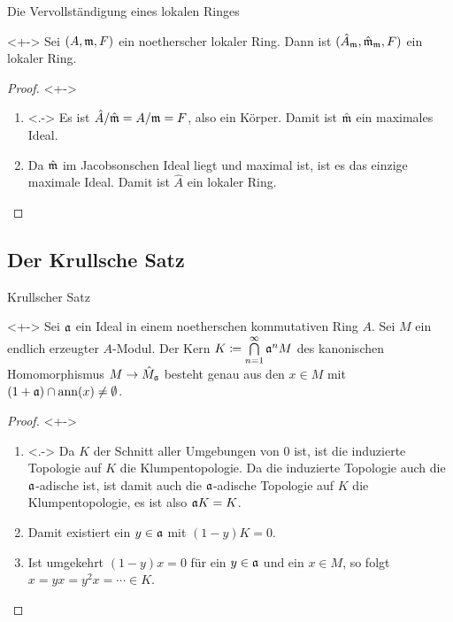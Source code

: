 \begin{frame}{Die Vervollständigung eines lokalen Ringes}
	\begin{proposition}<+->
		Sei \((A, \mathfrak{m}, F)\) ein noetherscher lokaler Ring. Dann ist
		\((\hat A_{\mathfrak{m}}, \hat{\mathfrak{m}}_{\mathfrak{m}}, F)\) ein lokaler Ring.
	\end{proposition}
	\begin{proof}<+->
		\begin{enumerate}[<+->]
		\item<.->
			Es ist \(\hat A/\hat{\mathfrak{m}} = A/\mathfrak{m} = F\), also ein Körper.  Damit ist
			\(\hat {\mathfrak{m}}\) ein maximales Ideal.
		\item
			Da \(\hat {\mathfrak{m}}\) im Jacobsonschen Ideal liegt und maximal ist, ist es das einzige
			maximale Ideal. Damit ist \(\hat A\) ein lokaler Ring.
			\qedhere
		\end{enumerate}
	\end{proof}
\end{frame}

\subsection{Der Krullsche Satz}

\begin{frame}{Krullscher Satz}
	\begin{theorem}<+->
		\label{thm:krull}
		Sei \(\mathfrak{a}\) ein Ideal in einem noetherschen kommutativen Ring \(A\). Sei
		\(M\) ein endlich erzeugter \(A\)-Modul. Der Kern \(K \coloneqq \bigcap\limits_{n = 1}^\infty
		\mathfrak{a}^n M\) des kanonischen Homomorphismus \(M \to \hat M_{\mathfrak{a}}\) besteht genau
		aus den \(x \in M\) mit \((1 + \mathfrak{a}) \cap \operatorname{ann}(x) \neq \emptyset\).
	\end{theorem}
	\begin{proof}<+->
		\begin{enumerate}[<+->]
		\item<.->
			Da \(K\) der Schnitt aller Umgebungen von \(0\) ist, ist die induzierte Topologie auf \(K\)
			die Klumpentopologie. Da die induzierte Topologie auch die \(\mathfrak{a}\)-adische ist,
			ist damit auch die \(\mathfrak{a}\)-adische Topologie auf \(K\)
			die Klumpentopologie, es ist also \(\mathfrak{a} K = K\).
		\item
			Damit existiert ein \(y \in \mathfrak{a}\) mit \((1 - y) K = 0\). 
		\item
			Ist umgekehrt \((1 - y) x = 0\) für ein \(y \in \mathfrak{a}\) und ein \(x \in M\), 
			so folgt \(x = y x = y^2 x = \dotsb \in K\).
			\qedhere
		\end{enumerate}
	\end{proof}
\end{frame}


